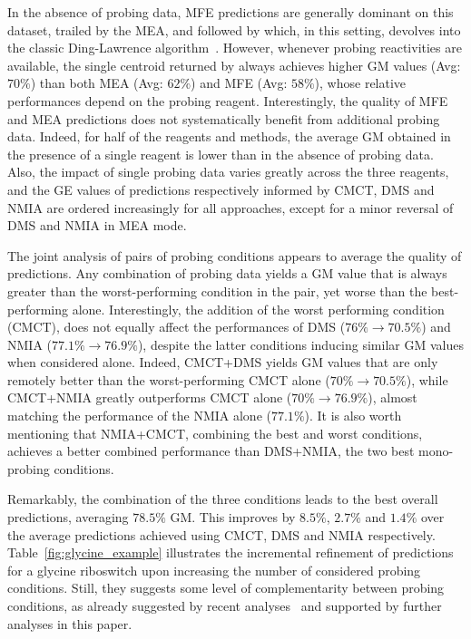 \documentclass[a4,center,fleqn]{NAR}
\begin{document}
In the absence of probing data, MFE predictions are generally dominant on this dataset, trailed by the MEA, and followed by \OurTool which, in this setting, devolves into the classic Ding-Lawrence algorithm~\citep{Ding2003}. However, whenever probing reactivities are available, the single centroid returned by \OurTool always achieves higher GM values (Avg: $70\%$) than both MEA (Avg: $62\%$) and MFE  (Avg: $58\%$), whose relative performances depend on the probing reagent. %
Interestingly, the quality of MFE and MEA predictions does not systematically benefit from additional probing data. Indeed, for half of the reagents and methods, the average GM obtained in the presence of a single reagent is lower than in the absence of probing data. Also, the impact of single probing data varies greatly across the three reagents, and the GE values of predictions respectively informed by CMCT, DMS and NMIA are ordered increasingly for all approaches, except for a minor reversal of DMS and NMIA in MEA mode.


The joint analysis of pairs of probing conditions appears to average the quality of predictions. Any combination of probing data yields a GM value that is always greater than the worst-performing condition in the pair, yet worse than the best-performing alone. Interestingly, the addition of the worst performing condition (CMCT), does not equally affect the performances of DMS ($76\% \to 70.5\%$) %
and NMIA  ($77.1\% \to 76.9\%$), %
despite the latter conditions inducing similar GM values when considered alone. Indeed, CMCT+DMS yields GM values that are only remotely better than the worst-performing CMCT alone  ($70\% \to 70.5\%$), while CMCT+NMIA greatly outperforms CMCT alone  ($70\% \to 76.9\%$), almost matching the performance of the NMIA alone ($77.1\%$). It is also worth mentioning that NMIA+CMCT, combining the best and worst conditions, achieves a better combined performance than DMS+NMIA, the two best mono-probing conditions. 


Remarkably, the combination of the three conditions leads to the best overall predictions, averaging $78.5\%$ GM.
This  improves by $8.5\%$, $2.7\%$ and $1.4\%$ over the average predictions achieved using CMCT, DMS and NMIA respectively.
Table~\ref{fig:glycine_example} illustrates the incremental refinement of \OurTool predictions for a glycine riboswitch upon increasing the number of considered probing conditions.
Still, they suggests some level of complementarity between probing conditions, as already suggested by recent analyses~\citep{Brunel2000,Steen2012,Rice2014,Yu2018}  and supported by further analyses in this paper.
\end{document}
